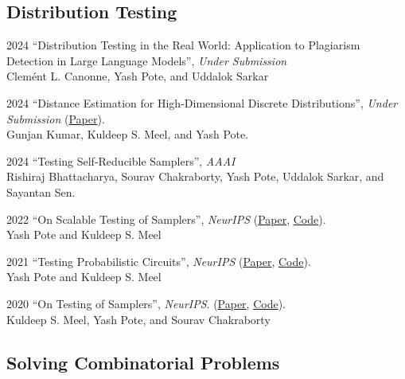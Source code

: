 \documentclass[12pt,letterpaper]{report}
\begin{document}
	
	\subsection*{Distribution Testing}
	\begin{tablist} 
	\item[2024] \tab  	\enquote{Distribution Testing in the Real World: Application to Plagiarism Detection in Large Language Models}, \textit{Under Submission}\\
		Clemént L. Canonne, Yash Pote, and Uddalok Sarkar
		
		\item[2024] \tab  	\enquote{Distance Estimation for High-Dimensional Discrete Distributions}, \textit{Under Submission} (\href{https://arxiv.org/abs/2308.04264}{Paper}).\\
		Gunjan Kumar,  Kuldeep S. Meel, and Yash Pote.

    	\item[2024] \tab \enquote{Testing Self-Reducible Samplers},  \textit{AAAI}\\
		Rishiraj Bhattacharya, Sourav Chakraborty, Yash Pote, Uddalok Sarkar, and Sayantan Sen.
		
		\item[2022] \tab  \enquote{On Scalable Testing of Samplers},  \textit{NeurIPS}  (\href{https://arxiv.org/abs/2306.13958}{Paper}, \href{https://github.com/meelgroup/barbarik}{Code}).\\
		Yash Pote  and Kuldeep S. Meel
		
	
		\item[2021] \tab  \enquote{Testing Probabilistic Circuits},  \textit{NeurIPS}  (\href{https://arxiv.org/abs/2112.04941}{Paper}, \href{https://github.com/meelgroup/teq}{Code}).\\
		Yash Pote  and Kuldeep S. Meel
		
		
		\item[2020] \tab  \enquote{On Testing of Samplers}, \textit{NeurIPS}. (\href{https://arxiv.org/abs/2010.12918}{Paper}, \href{https://github.com/meelgroup/barbarik}{Code}).\\
		Kuldeep S. Meel, Yash Pote, and Sourav Chakraborty
		
	\end{tablist}

	\subsection*{Solving Combinatorial Problems}
\end{document}
